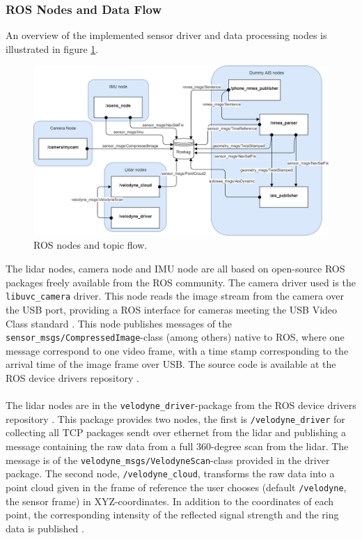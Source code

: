 \subsubsection{ROS Nodes and Data Flow}
An overview of the implemented sensor driver and data processing nodes is illustrated in figure \ref{fig:ros_nodes}.
\begin{figure}[H]
    \centering
    \includegraphics[width=.8\linewidth]{fig/ros.png}
    \caption{ROS nodes and topic flow.}
    \label{fig:ros_nodes}
\end{figure}
The lidar nodes, camera node and IMU node are all based on open-source ROS packages freely available from the ROS community. The camera driver used is the \lstinline[basicstyle=\ttfamily]{libuvc_camera} driver. This node reads the image stream from the camera over the USB port, providing a ROS interface for cameras meeting the USB Video Class standard \cite{libuvc_camera}. This node publishes messages of the \lstinline[basicstyle=\ttfamily]{sensor_msgs/CompressedImage}-class (among others) native to ROS, where one message correspond to one video frame, with a time stamp corresponding to the arrival time of the image frame over USB. The source code is available at the ROS device drivers repository \cite{ros_drivers}.\\
\vspace{2mm}\\
\noindent The lidar nodes are in the \lstinline[basicstyle=\ttfamily]{velodyne_driver}-package from the ROS device drivers repository \cite{ros_drivers}. This package provides two nodes, the first is \lstinline[basicstyle=\ttfamily]{/velodyne_driver} for collecting all TCP packages sendt over ethernet from the lidar and publishing a message containing the raw data from a full 360-degree scan from the lidar. The message is of the \lstinline[basicstyle=\ttfamily]{velodyne_msgs/VelodyneScan}-class provided in the driver package. The second node, \lstinline[basicstyle=\ttfamily]{/velodyne_cloud}, transforms the raw data into a point cloud given in the frame of reference the user chooses (default \lstinline[basicstyle=\ttfamily]{/velodyne}, the sensor frame) in XYZ-coordinates. In addition to the coordinates of each point, the corresponding intensity of the reflected signal strength and the ring data is published \cite{velodyne_driver}.\\ 
